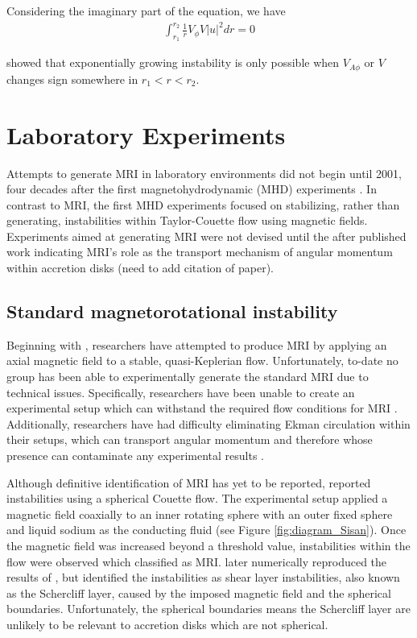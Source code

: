 \documentclass{jfm}
\begin{document}
Considering the imaginary part of the equation, we have 
\begin{align}
    \int_{r_1}^{r_2} \frac{1}{r}V_\phi V |u|^2 dr =0
\end{align}

\cite{Knobloch1992} showed that exponentially growing instability is only possible 
when $V_{A\phi}$ or $V$ changes sign somewhere in $r_1< r < r_2$.



\section{Laboratory Experiments}
\label{sec:experiments}

Attempts to generate MRI in laboratory environments did not begin until 2001,
four decades after the first magnetohydrodynamic (MHD) experiments
\citep{Donnelly1960}. In contrast to MRI, the first MHD experiments focused on
stabilizing, rather than generating, instabilities within Taylor-Couette flow
using magnetic fields. Experiments aimed at generating MRI were not devised
until the after published work indicating MRI's role as the transport mechanism
of angular momentum within accretion disks (need to add citation of paper).

%
%
\subsection{Standard magnetorotational instability}
\label{sec:standard_mri}
Beginning with \cite{Ji2001}, researchers have attempted to produce MRI by
applying an axial magnetic field to a stable, quasi-Keplerian flow.
Unfortunately, to-date no group has been able to experimentally generate the
standard MRI due to technical issues. Specifically, researchers have been
unable to create an experimental setup which can withstand the required flow
conditions for MRI \citep{Ji2001, Ji2002}. Additionally, researchers have had
difficulty eliminating Ekman circulation within their setups, which can
transport angular momentum and therefore whose presence can contaminate any
experimental results \citep{Kageyama2004}.

Although definitive identification of MRI has yet to be reported,
\cite{Sisan2004} reported instabilities using a spherical Couette flow. The
experimental setup applied a magnetic field coaxially to an inner rotating
sphere with an outer fixed sphere and liquid sodium as the conducting fluid
(see Figure \ref{fig:diagram_Sisan}).  Once the magnetic field was increased
beyond a threshold value, instabilities within the flow were observed which
\cite{Sisan2004} classified as MRI.  \cite{Gissinger2011} later numerically
reproduced the results of \cite{Sisan2004}, but identified the instabilities as
shear layer instabilities, also known as the Schercliff layer, caused by the
imposed magnetic field and the spherical boundaries.  Unfortunately, the
spherical boundaries means the Schercliff layer are unlikely to be relevant to
accretion disks which are not spherical.
\end{document}
